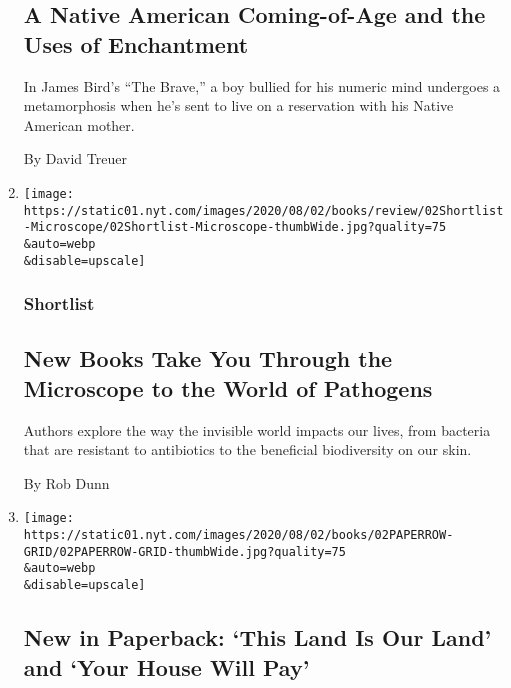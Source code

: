 \begin{enumerate}
  \hypertarget{a-native-american-coming-of-age-and-the-uses-of-enchantment}{%
  \subsection{A Native American Coming-of-Age and the Uses of
  Enchantment}\label{a-native-american-coming-of-age-and-the-uses-of-enchantment}}

  In James Bird's ``The Brave,'' a boy bullied for his numeric mind
  undergoes a metamorphosis when he's sent to live on a reservation with
  his Native American mother.

  By David Treuer
\item
  \href{/2020/07/31/books/review/biography-of-resistance-muhammad-zaman-clean-james-hamblin-the-sensitives-oliver-broudy.html}{}

  \texttt{[image: https://static01.nyt.com/images/2020/08/02/books/review/02Shortlist-Microscope/02Shortlist-Microscope-thumbWide.jpg?quality=75\\\&auto=webp\\\&disable=upscale]}

  \hypertarget{shortlist}{%
  \subsubsection{Shortlist}\label{shortlist}}

  \hypertarget{new-books-take-you-through-the-microscope-to-the-world-of-pathogens}{%
  \subsection{New Books Take You Through the Microscope to the World of
  Pathogens}\label{new-books-take-you-through-the-microscope-to-the-world-of-pathogens}}

  Authors explore the way the invisible world impacts our lives, from
  bacteria that are resistant to antibiotics to the beneficial
  biodiversity on our skin.

  By Rob Dunn
\item
  \href{/2020/07/31/books/review/new-paperbacks.html}{}

  \texttt{[image: https://static01.nyt.com/images/2020/08/02/books/02PAPERROW-GRID/02PAPERROW-GRID-thumbWide.jpg?quality=75\\\&auto=webp\\\&disable=upscale]}

  \hypertarget{new-in-paperback-this-land-is-our-land-and-your-house-will-pay}{%
  \subsection{New in Paperback: `This Land Is Our Land' and `Your House
  Will
  Pay'}\label{new-in-paperback-this-land-is-our-land-and-your-house-will-pay}}


\end{enumerate}

